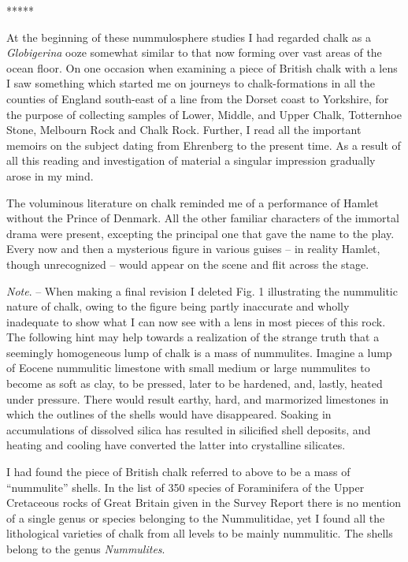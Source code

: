 \documentclass[a4paper, 12pt, oneside]{article}
\begin{document}
\centerline{*\hspace{15mm}*\hspace{15mm}*\hspace{15mm}*\hspace{15mm}*}
\bigskip

At the beginning of these nummulosphere studies I had regarded chalk as a \emph{Globigerina} ooze somewhat similar to that now forming over vast areas of the ocean floor. On one occasion when examining a piece of British chalk with a lens I saw something which started me on journeys to chalk-formations in all the counties of England south-east of a line from the Dorset coast to Yorkshire, for the purpose of collecting samples of Lower, Middle, and Upper Chalk, Totternhoe Stone, Melbourn Rock and Chalk Rock. Further, I read all the important memoirs on the subject dating from Ehrenberg to the present time. As a result of all this reading and investigation of material a singular impression gradually arose in my mind.

The voluminous literature on chalk reminded me of a performance of Hamlet without the Prince of Denmark. All the other familiar characters of the immortal drama were present, excepting the principal one that gave the name to the play. Every now and then a mysterious figure in various guises -- in reality Hamlet, though unrecognized -- would appear on the scene and flit across the stage.

\emph{Note}. -- When making a final revision I deleted Fig. 1 illustrating the nummulitic nature of chalk, owing to the figure being partly inaccurate and wholly inadequate to show what I can now see with a lens in most pieces of this rock. The following hint may help towards a realization of the strange truth that a seemingly homogeneous lump of chalk is a mass of nummulites. Imagine a lump of Eocene nummulitic limestone with small medium or large nummulites to become as soft as clay, to be pressed, later to be hardened, and, lastly, heated under pressure. There would result earthy, hard, and marmorized limestones in which the outlines of the shells would have disappeared. Soaking in accumulations of dissolved silica has resulted in silicified shell deposits, and heating and cooling have converted the latter into crystalline silicates.

I had found the piece of British chalk referred to above to be a mass of ``nummulite'' shells. In the list of 350 species of Foraminifera of the Upper Cretaceous rocks of Great Britain given in the Survey Report there is no mention of a single genus or species belonging to the Nummulitidae, yet I found all the lithological varieties of chalk from all levels to be mainly nummulitic. The shells belong to the genus \emph{Nummulites}.
\end{document}
